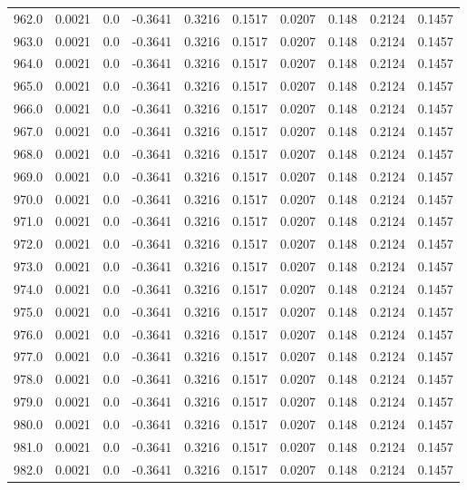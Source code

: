 \begin{longtable}{lrrrrrrrrr}
962.0 & 0.0021 & 0.0 & -0.3641 & 0.3216 & 0.1517 & 0.0207 & 0.148 & 0.2124 & 0.1457 \\
963.0 & 0.0021 & 0.0 & -0.3641 & 0.3216 & 0.1517 & 0.0207 & 0.148 & 0.2124 & 0.1457 \\
964.0 & 0.0021 & 0.0 & -0.3641 & 0.3216 & 0.1517 & 0.0207 & 0.148 & 0.2124 & 0.1457 \\
965.0 & 0.0021 & 0.0 & -0.3641 & 0.3216 & 0.1517 & 0.0207 & 0.148 & 0.2124 & 0.1457 \\
966.0 & 0.0021 & 0.0 & -0.3641 & 0.3216 & 0.1517 & 0.0207 & 0.148 & 0.2124 & 0.1457 \\
967.0 & 0.0021 & 0.0 & -0.3641 & 0.3216 & 0.1517 & 0.0207 & 0.148 & 0.2124 & 0.1457 \\
968.0 & 0.0021 & 0.0 & -0.3641 & 0.3216 & 0.1517 & 0.0207 & 0.148 & 0.2124 & 0.1457 \\
969.0 & 0.0021 & 0.0 & -0.3641 & 0.3216 & 0.1517 & 0.0207 & 0.148 & 0.2124 & 0.1457 \\
970.0 & 0.0021 & 0.0 & -0.3641 & 0.3216 & 0.1517 & 0.0207 & 0.148 & 0.2124 & 0.1457 \\
971.0 & 0.0021 & 0.0 & -0.3641 & 0.3216 & 0.1517 & 0.0207 & 0.148 & 0.2124 & 0.1457 \\
972.0 & 0.0021 & 0.0 & -0.3641 & 0.3216 & 0.1517 & 0.0207 & 0.148 & 0.2124 & 0.1457 \\
973.0 & 0.0021 & 0.0 & -0.3641 & 0.3216 & 0.1517 & 0.0207 & 0.148 & 0.2124 & 0.1457 \\
974.0 & 0.0021 & 0.0 & -0.3641 & 0.3216 & 0.1517 & 0.0207 & 0.148 & 0.2124 & 0.1457 \\
975.0 & 0.0021 & 0.0 & -0.3641 & 0.3216 & 0.1517 & 0.0207 & 0.148 & 0.2124 & 0.1457 \\
976.0 & 0.0021 & 0.0 & -0.3641 & 0.3216 & 0.1517 & 0.0207 & 0.148 & 0.2124 & 0.1457 \\
977.0 & 0.0021 & 0.0 & -0.3641 & 0.3216 & 0.1517 & 0.0207 & 0.148 & 0.2124 & 0.1457 \\
978.0 & 0.0021 & 0.0 & -0.3641 & 0.3216 & 0.1517 & 0.0207 & 0.148 & 0.2124 & 0.1457 \\
979.0 & 0.0021 & 0.0 & -0.3641 & 0.3216 & 0.1517 & 0.0207 & 0.148 & 0.2124 & 0.1457 \\
980.0 & 0.0021 & 0.0 & -0.3641 & 0.3216 & 0.1517 & 0.0207 & 0.148 & 0.2124 & 0.1457 \\
981.0 & 0.0021 & 0.0 & -0.3641 & 0.3216 & 0.1517 & 0.0207 & 0.148 & 0.2124 & 0.1457 \\
982.0 & 0.0021 & 0.0 & -0.3641 & 0.3216 & 0.1517 & 0.0207 & 0.148 & 0.2124 & 0.1457 \\

\end{longtable}
